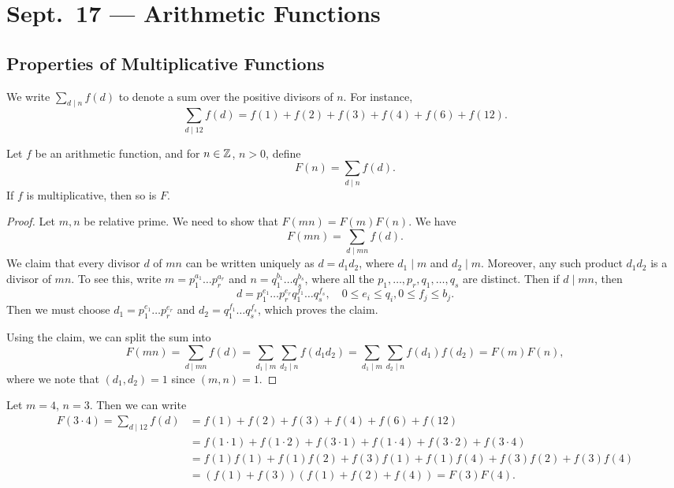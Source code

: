 \chapter{Sept.~17 --- Arithmetic Functions}

\section{Properties of Multiplicative Functions}

\begin{remark}
  We write $\sum_{d \mid n} f(d)$
  to denote a sum over the positive
  divisors of $n$. For instance,
  \[
    \sum_{d \mid 12} f(d)
    = f(1) + f(2) + f(3) + f(4) + f(6) + f(12).
  \]
\end{remark}

\begin{theorem}
  Let $f$ be an arithmetic function, and
  for $n \in \mathbb{Z}$, $n > 0$, define
  \[
    F(n) = \sum_{d \mid n} f(d).
  \]
  If $f$ is multiplicative, then so is
  $F$.
\end{theorem}

\begin{proof}
  Let $m, n$ be relative prime. We need
  to show that $F(mn) = F(m)F(n)$. We have
  \[
    F(mn) = \sum_{d \mid mn} f(d).
  \]
  We claim that every divisor $d$ of
  $mn$ can be written uniquely as
  $d = d_1 d_2$, where $d_1 \mid m$ and
  $d_2 \mid m$. Moreover, any such
  product $d_1 d_2$ is a divisor of $mn$.
  To see this, write
  $m = p_1^{a_1} \dots p_r^{a_r}$ and
  $n = q_1^{b_1} \dots q_s^{b_s}$, where
  all the $p_1, \dots, p_r, q_1, \dots, q_s$
  are distinct. Then if $d \mid mn$, then
  \[
    d = p_1^{e_1} \dots p_r^{e_r} q_1^{f_1} \dots q_s^{f_s},
    \quad 0 \le e_i \le q_i, 0 \le f_j \le b_j.
  \]
  Then we must choose $d_1 = p_1^{e_1} \dots p_r^{e_r}$
  and $d_2 = q_1^{f_1} \dots q_s^{f_s}$,
  which proves the claim.

  Using the claim, we can split the sum
  into
  \[
    F(mn) = \sum_{d \mid mn} f(d)
    = \sum_{d_1 \mid m} \sum_{d_2 \mid n} f(d_1 d_2)
    = \sum_{d_1 \mid m} \sum_{d_2 \mid n} f(d_1) f(d_2)
    = F(m) F(n),
  \]
  where we note that $(d_1, d_2) = 1$
  since $(m, n) = 1$.
\end{proof}

\begin{example}
  Let $m = 4$, $n = 3$. Then we can write
  \begin{align*}
    F(3 \cdot 4)
    = \sum_{d \mid 12}
    f(d)
    &= f(1) + f(2) + f(3) + f(4) + f(6) + f(12) \\
    &= f(1 \cdot 1) + f(1 \cdot 2) + f(3 \cdot 1) + f(1 \cdot 4) + f(3 \cdot 2) + f(3 \cdot 4) \\
    &= f(1) f(1) + f(1) f(2) + f(3) f(1) + f(1) f(4) + f(3) f(2) + f(3) f(4) \\
    &= (f(1) + f(3))(f(1) + f(2) + f(4))
    = F(3) F(4).
  \end{align*}
\end{example}


